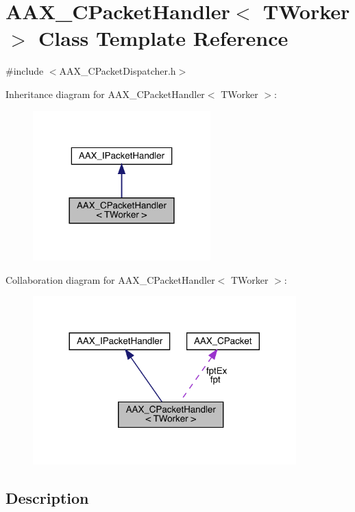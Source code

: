 \hypertarget{a01525}{}\section{A\+A\+X\+\_\+\+C\+Packet\+Handler$<$ T\+Worker $>$ Class Template Reference}
\label{a01525}


{\ttfamily \#include $<$A\+A\+X\+\_\+\+C\+Packet\+Dispatcher.\+h$>$}



Inheritance diagram for A\+A\+X\+\_\+\+C\+Packet\+Handler$<$ T\+Worker $>$\+:
\nopagebreak
\begin{figure}[H]
\begin{center}
\leavevmode
\includegraphics[width=194pt]{a01524}
\end{center}
\end{figure}


Collaboration diagram for A\+A\+X\+\_\+\+C\+Packet\+Handler$<$ T\+Worker $>$\+:
\nopagebreak
\begin{figure}[H]
\begin{center}
\leavevmode
\includegraphics[width=288pt]{a01523}
\end{center}
\end{figure}


\subsection{Description}
